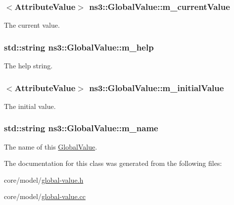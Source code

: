 \subsubsection[{\texorpdfstring{m\+\_\+current\+Value}{m_currentValue}}]{$<${\bf Attribute\+Value}$>$ ns3\+::\+Global\+Value\+::m\+\_\+current\+Value\hspace{0.3cm}{\ttfamily [private]}}\hypertarget{classns3_1_1GlobalValue_ac1b6a8c1ae676b1733a5d0c23415e293}{}\label{classns3_1_1GlobalValue_ac1b6a8c1ae676b1733a5d0c23415e293}
The current value. 
\subsubsection[{\texorpdfstring{m\+\_\+help}{m_help}}]{\setlength{\rightskip}{0pt plus 5cm}std\+::string ns3\+::\+Global\+Value\+::m\+\_\+help\hspace{0.3cm}{\ttfamily [private]}}\hypertarget{classns3_1_1GlobalValue_a8f1879be6f6eb27f9efc4599eb7d6b58}{}\label{classns3_1_1GlobalValue_a8f1879be6f6eb27f9efc4599eb7d6b58}
The help string. 
\subsubsection[{\texorpdfstring{m\+\_\+initial\+Value}{m_initialValue}}]{$<${\bf Attribute\+Value}$>$ ns3\+::\+Global\+Value\+::m\+\_\+initial\+Value\hspace{0.3cm}{\ttfamily [private]}}\hypertarget{classns3_1_1GlobalValue_ad7963fb567f993a0a14bd8ff87553d11}{}\label{classns3_1_1GlobalValue_ad7963fb567f993a0a14bd8ff87553d11}
The initial value. 
\subsubsection[{\texorpdfstring{m\+\_\+name}{m_name}}]{\setlength{\rightskip}{0pt plus 5cm}std\+::string ns3\+::\+Global\+Value\+::m\+\_\+name\hspace{0.3cm}{\ttfamily [private]}}\hypertarget{classns3_1_1GlobalValue_aee127b09561e9714565260194dbec3ad}{}\label{classns3_1_1GlobalValue_aee127b09561e9714565260194dbec3ad}
The name of this \hyperlink{classns3_1_1GlobalValue}{Global\+Value}. 

The documentation for this class was generated from the following files\+:\begin{DoxyCompactItemize}
\item 
core/model/\hyperlink{global-value_8h}{global-\/value.\+h}\item 
core/model/\hyperlink{global-value_8cc}{global-\/value.\+cc}\end{DoxyCompactItemize}
